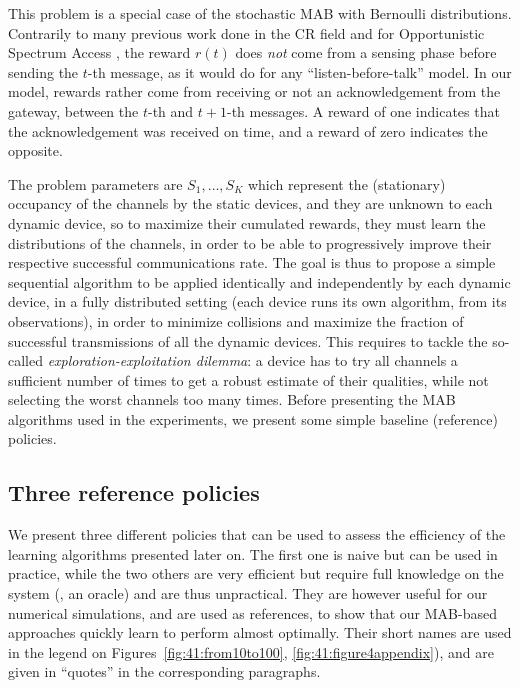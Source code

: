 This problem is a special case of the stochastic MAB with
Bernoulli distributions.
Contrarily to many previous work done in the CR field and for Opportunistic Spectrum Access \cite{Jouini10,Jouini12},
the reward $r(t)$ does \emph{not} come from a sensing phase before sending the $t$-th message, as it would do for any ``listen-before-talk'' model.
In our model, rewards rather come from receiving or not an acknowledgement from the gateway, between the $t$-th and $t+1$-th messages. A reward of one indicates that the acknowledgement was received on time, and a reward of zero indicates the opposite.

The problem parameters
are $S_1, \dots, S_K$ which represent the (stationary) occupancy of the channels by the static devices,
and they are unknown to each dynamic device, so to maximize their cumulated rewards, they must learn the distributions of the channels, in order to be able to progressively improve their respective successful communications rate.
%
The goal is thus to propose a simple sequential algorithm to be applied identically and independently by each dynamic device, in a fully distributed setting (each device runs its own algorithm, from its observations), in order to minimize collisions and maximize the fraction of successful transmissions of all the dynamic devices.
%
This requires to tackle the so-called \emph{exploration-exploitation dilemma}: a device has to try all channels a sufficient number of times to get a robust estimate of their qualities, while not selecting the worst channels too many times.
%
Before presenting the MAB algorithms used in the experiments, we present some simple baseline (reference) policies.


\subsection{Three reference policies}\label{sub:41:threeReferencePolicies}

We present three different policies that can be used to assess the efficiency of the learning algorithms presented later on.
The first one is naive but can be used in practice, while the two others are very efficient but require full knowledge on the system (\ie, an oracle) and are thus unpractical.
%
They are however useful for our numerical simulations, and are used as references, to show that our MAB-based approaches quickly learn to perform almost optimally.
%
Their short names are used in the legend on Figures~\ref{fig:41:from10to100}, \ref{fig:41:figure4appendix}), and are given in ``quotes'' in the corresponding paragraphs.


